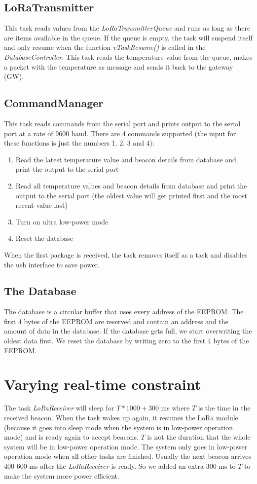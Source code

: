 \documentclass{scrartcl}
\begin{document}
\newpage

\subsection{LoRaTransmitter}
This task reads values from the \textit{LoRaTransmitterQueue} and runs as long as there are items available in the queue.
If the queue is empty, the task will suspend itself and only resume when the function \textit{vTaskResume()} is called in the \textit{DatabaseController}.
This task reads the temperature value from the queue, makes a packet with the temperature as message and sends it back to the gateway (GW).

\subsection{CommandManager}
This task reads commands from the serial port and prints output to the serial port at a rate of 9600 baud.
There are 4 commands supported (the input for these functions is just the numbers 1, 2, 3 and 4):
\begin{enumerate}
    \item Read the latest temperature value and beacon details from database and print the output to the serial port
    \item Read all temperature values and beacon details from database and print the output to the serial port
        (the oldest value will get printed first and the most recent value last)
    \item Turn on ultra low-power mode
    \item Reset the database
\end{enumerate}
When the first package is received, the task removes itself as a task and disables the usb interface to save power.

\subsection{The Database}
The database is a circular buffer that uses every address of the EEPROM.
The first 4 bytes of the EEPROM are reserved and contain an address and the amount of data in the database.
If the database gets full, we start overwriting the oldest data first.
We reset the database by writing zero to the first 4 bytes of the EEPROM.

\section{Varying real-time constraint}
The task \textit{LoRaReceiver} will sleep for $T*1000 + 300$ \si{\milli\second} where $T$ is the time in the received beacon.
When the task wakes up again, it resumes the LoRa module (because it goes into sleep mode when the system is in low-power operation mode)
and is ready again to accept beacons. $T$ is not the duration that the whole system will be in low-power operation mode.
The system only goes in low-power operation mode when all other tasks are finished.
Usually the next beacon arrives 400-600 \si{\milli\second} after the \textit{LoRaReceiver} is ready.
So we added an extra 300 \si{\milli\second} to $T$ to make the system more power efficient.
\end{document}
